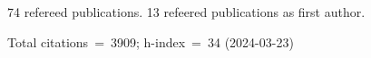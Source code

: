 74 refereed publications. 13 refeered publications as first author.

Total citations~=~3909; h-index~=~34 (2024-03-23)